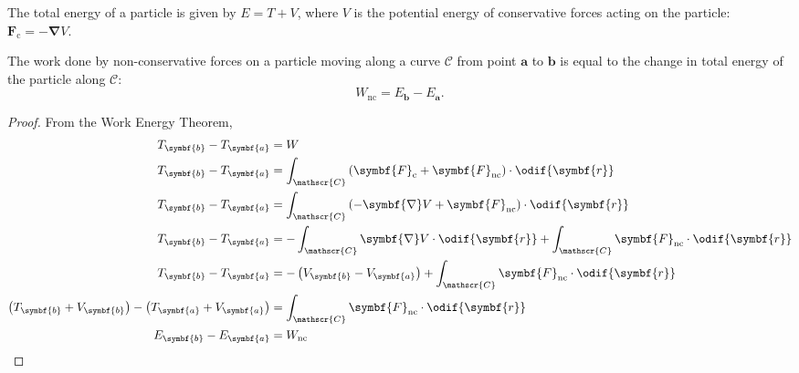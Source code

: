 \documentclass{article}
\begin{document}
\begin{definition}
    The total energy of a particle is given by \(E = T + V\), where \(V\)
    is the potential energy of conservative forces acting on the particle:
    \(\symbf{F}_{\text{c}} = -\symbf{\nabla} V\).
\end{definition}
\begin{theorem}
    The work done by non-conservative forces on a particle moving along
    a curve \(\mathscr{C}\) from point \(\symbf{a}\) to \(\symbf{b}\) is
    equal to the change in total energy of the particle along \(\mathscr{C}\):
    \begin{equation*}
        W_{\mathrm{nc}} = E_{\symbf{b}} - E_{\symbf{a}}.
    \end{equation*}
\end{theorem}
\begin{proof}
    From the Work Energy Theorem,
    \begin{align*}
        T_{\symbf{b}} - T_{\symbf{a}}                                                               & = W                                                                                                                             \\
        T_{\symbf{b}} - T_{\symbf{a}}                                                               & = \int_{\mathscr{C}} \left( \symbf{F}_{\text{c}} + \symbf{F}_{\text{nc}} \right) \cdot \odif{\symbf{r}}                         \\
        T_{\symbf{b}} - T_{\symbf{a}}                                                               & = \int_{\mathscr{C}} \left( -\symbf{\nabla} V + \symbf{F}_{\text{nc}} \right) \cdot \odif{\symbf{r}}                            \\
        T_{\symbf{b}} - T_{\symbf{a}}                                                               & = -\int_{\mathscr{C}} \symbf{\nabla} V \cdot \odif{\symbf{r}} + \int_{\mathscr{C}} \symbf{F}_{\text{nc}} \cdot \odif{\symbf{r}} \\
        T_{\symbf{b}} - T_{\symbf{a}}                                                               & = -\left( V_{\symbf{b}} - V_{\symbf{a}} \right) + \int_{\mathscr{C}} \symbf{F}_{\text{nc}} \cdot \odif{\symbf{r}}               \\
        \left( T_{\symbf{b}} + V_{\symbf{b}} \right) - \left( T_{\symbf{a}} + V_{\symbf{a}} \right) & = \int_{\mathscr{C}} \symbf{F}_{\text{nc}} \cdot \odif{\symbf{r}}                                                               \\
        E_{\symbf{b}} - E_{\symbf{a}}                                                               & = W_{\text{nc}}
    \end{align*}
\end{proof}
\end{document}
